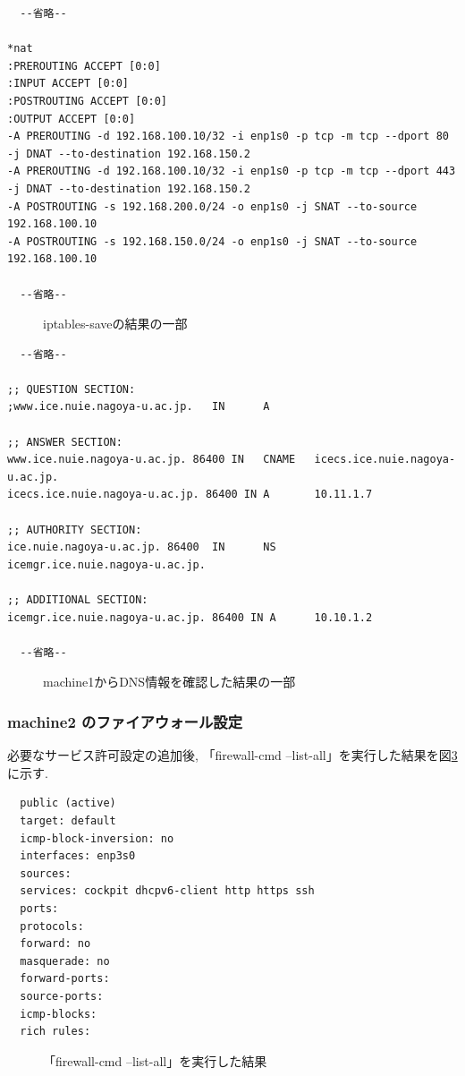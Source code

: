 \documentclass{ltjsarticle} %
\begin{document}
\begin{mdframed}
\begin{verbatim}
  --省略--

*nat
:PREROUTING ACCEPT [0:0]
:INPUT ACCEPT [0:0]
:POSTROUTING ACCEPT [0:0]
:OUTPUT ACCEPT [0:0]
-A PREROUTING -d 192.168.100.10/32 -i enp1s0 -p tcp -m tcp --dport 80 -j DNAT --to-destination 192.168.150.2
-A PREROUTING -d 192.168.100.10/32 -i enp1s0 -p tcp -m tcp --dport 443 -j DNAT --to-destination 192.168.150.2
-A POSTROUTING -s 192.168.200.0/24 -o enp1s0 -j SNAT --to-source 192.168.100.10
-A POSTROUTING -s 192.168.150.0/24 -o enp1s0 -j SNAT --to-source 192.168.100.10 

  --省略--    
  \end{verbatim}
  \end{mdframed}
  \begin{figure}[H]
  \caption{iptables-saveの結果の一部}
  \label{fig:save}
\end{figure}

\begin{mdframed}
  \begin{verbatim}  
  --省略--

;; QUESTION SECTION:
;www.ice.nuie.nagoya-u.ac.jp.   IN      A

;; ANSWER SECTION:
www.ice.nuie.nagoya-u.ac.jp. 86400 IN   CNAME   icecs.ice.nuie.nagoya-u.ac.jp.
icecs.ice.nuie.nagoya-u.ac.jp. 86400 IN A       10.11.1.7

;; AUTHORITY SECTION:
ice.nuie.nagoya-u.ac.jp. 86400  IN      NS      icemgr.ice.nuie.nagoya-u.ac.jp.

;; ADDITIONAL SECTION:
icemgr.ice.nuie.nagoya-u.ac.jp. 86400 IN A      10.10.1.2    
  
  --省略--
  \end{verbatim}
  \end{mdframed}
  \begin{figure}[H]
  \caption{machine1からDNS情報を確認した結果の一部}
  \label{fig:dig1}
\end{figure}

\subsubsection{machine2 のファイアウォール設定}
必要なサービス許可設定の追加後, 「firewall-cmd --list-all」を実行した結果を図\ref{fig:list} に示す. 

\begin{mdframed}
  \begin{verbatim}  
  public (active)
  target: default
  icmp-block-inversion: no
  interfaces: enp3s0
  sources:
  services: cockpit dhcpv6-client http https ssh
  ports:
  protocols:
  forward: no
  masquerade: no
  forward-ports:
  source-ports:
  icmp-blocks:
  rich rules:
  \end{verbatim}
  \end{mdframed}
  \begin{figure}[H]
  \caption{「firewall-cmd --list-all」を実行した結果}
  \label{fig:list}
\end{figure}
\end{document}
